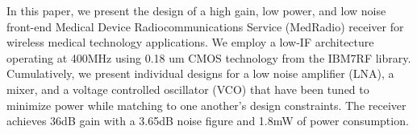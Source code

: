 In this paper, we present the design of a high gain, low power, and low noise front-end Medical Device Radiocommunications Service (MedRadio) receiver for wireless medical technology applications. We employ a low-IF architecture operating at 400MHz using 0.18 um CMOS technology from the IBM7RF library. Cumulatively, we present individual designs for a low noise amplifier (LNA), a mixer, and a voltage controlled oscillator (VCO) that have been tuned to minimize power while matching to one another's design constraints. The receiver achieves 36dB gain with a 3.65dB noise figure and 1.8mW of power consumption.